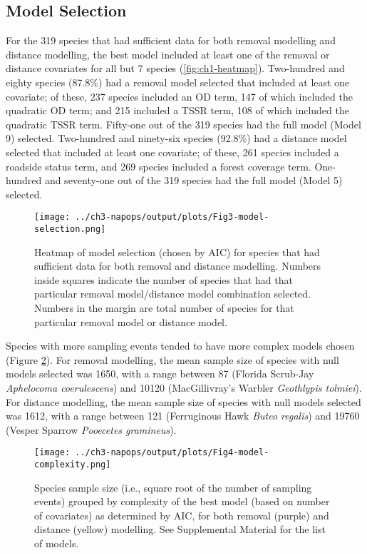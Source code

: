 \subsection{Model Selection}
\par For the 319 species that had sufficient data for both removal modelling and distance modelling, the best model included at least one of the removal or distance covariates for all but 7 species (\autoref{fig:ch1-heatmap}). Two-hundred and eighty species (87.8\%) had a removal model selected that included at least one covariate; of these, 237 species included an OD term, 147 of which included the quadratic OD term; and 215 included a TSSR term, 108 of which included the quadratic TSSR term. Fifty-one out of the 319 species had the full model (Model 9) selected. Two-hundred and ninety-six species (92.8\%) had a distance model selected that included at least one covariate; of these, 261 species included a roadside status term, and 269 species included a forest coverage term. One-hundred and seventy-one out of the 319 species had the full model (Model 5) selected.

\begin{figure}[h]
	\centering
	\texttt{[image: ../ch3-napops/output/plots/Fig3-model-selection.png]}
	\caption{\label{fig:ch1-heatmap}Heatmap of model selection (chosen by AIC) for species that had sufficient data for both removal and distance modelling. Numbers inside squares indicate the number of species that had that particular removal model/distance model combination selected. Numbers in the margin are total number of species for that particular removal model or distance model.}
\end{figure}

\par Species with more sampling events tended to have more complex models chosen (Figure \ref{fig:ch1-complexity}). For removal modelling, the mean sample size of species with null models selected was 1650, with a range between 87 (Florida Scrub-Jay \textit{Aphelocoma coerulescens}) and 10120 (MacGillivray’s Warbler \textit{Geothlypis tolmiei}). For distance modelling, the mean sample size of species with null models selected was 1612, with a range between 121 (Ferruginous Hawk \textit{Buteo regalis}) and 19760 (Vesper Sparrow \textit{Pooecetes gramineus}).

\begin{figure}[h]
	\centering
	\texttt{[image: ../ch3-napops/output/plots/Fig4-model-complexity.png]}
	\caption{\label{fig:ch1-complexity}Species sample size (i.e., square root of the number of sampling events) grouped by complexity of the best model (based on number of covariates) as determined by AIC, for both removal (purple) and distance (yellow) modelling. See Supplemental Material for the list of models.}
\end{figure}

